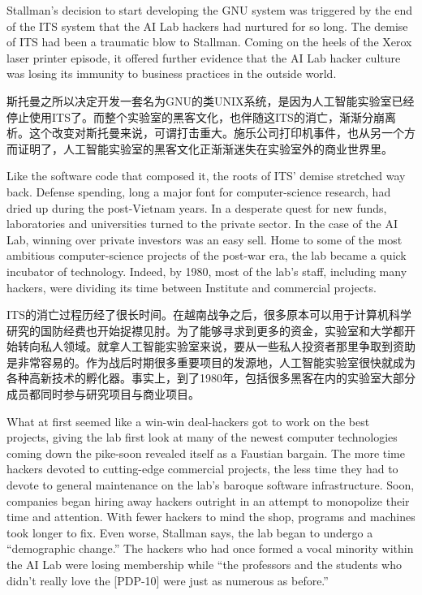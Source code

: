 \ifdefined\eng
Stallman's decision to start developing the GNU system was triggered by the end of the ITS system that the AI Lab hackers had nurtured for so long. The demise of ITS had been a traumatic blow to Stallman. Coming on the heels of the Xerox laser printer episode, it offered further evidence that the AI Lab hacker culture was losing its immunity to business practices in the outside world.
\fi

\ifdefined\chs
斯托曼之所以决定开发一套名为GNU的类UNIX系统，是因为人工智能实验室已经停止使用ITS了。而整个实验室的黑客文化，也伴随这ITS的消亡，渐渐分崩离析。这个改变对斯托曼来说，可谓打击重大。施乐公司打印机事件，也从另一个方而证明了，人工智能实验室的黑客文化正渐渐迷失在实验室外的商业世界里。
\fi

\ifdefined\eng
Like the software code that composed it, the roots of ITS' demise stretched way back. Defense spending, long a major font for computer-science research, had dried up during the post-Vietnam years. In a desperate quest for new funds, laboratories and universities turned to the private sector. In the case of the AI Lab, winning over private investors was an easy sell. Home to some of the most ambitious computer-science projects of the post-war era, the lab became a quick incubator of technology. Indeed, by 1980, most of the lab's staff, including many hackers, were dividing its time between Institute and commercial projects.
\fi

\ifdefined\chs
ITS的消亡过程历经了很长时间。在越南战争之后，很多原本可以用于计算机科学研究的国防经费也开始捉襟见肘。为了能够寻求到更多的资金，实验室和大学都开始转向私人领域。就拿人工智能实验室来说，要从一些私人投资者那里争取到资助是非常容易的。作为战后时期很多重要项目的发源地，人工智能实验室很快就成为各种高新技术的孵化器。事实上，到了1980年，包括很多黑客在内的实验室大部分成员都同时参与研究项目与商业项目。
\fi

\ifdefined\eng
What at first seemed like a win-win deal-hackers got to work on the best projects, giving the lab first look at many of the newest computer technologies coming down the pike-soon revealed itself as a Faustian bargain. The more time hackers devoted to cutting-edge commercial projects, the less time they had to devote to general maintenance on the lab's baroque software infrastructure. Soon, companies began hiring away hackers outright in an attempt to monopolize their time and attention. With fewer hackers to mind the shop, programs and machines took longer to fix. Even worse, Stallman says, the lab began to undergo a ``demographic change.'' The hackers who had once formed a vocal minority within the AI Lab were losing membership while ``the professors and the students who didn't really love the [PDP-10] were just as numerous as before.''
\fi

